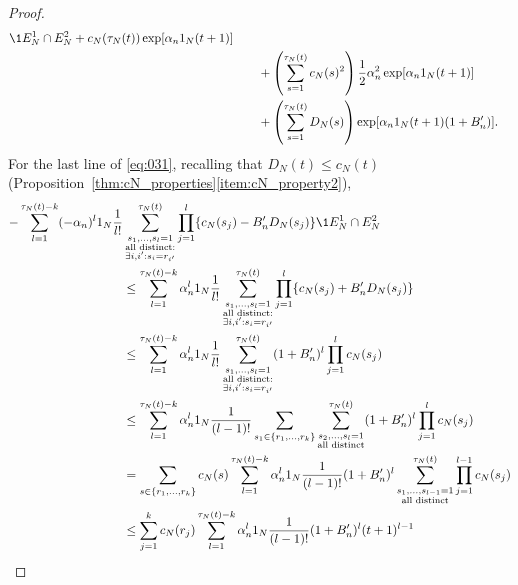 \begin{proof}
\begin{align*}
        \1{E_N^1 \cap E_N^2}
        + c_N(\tau_N(t)) \exp[ \alpha_n \ON (t+1) ] \\
    &\qquad+ \left( \sum_{s=1}^{\tau_N(t)} c_N(s)^2 \right)
        \frac{1}{2} \alpha_n^2 \exp[ \alpha_n \ON (t+1) ] \\
    &\qquad+ \left( \sum_{s=1}^{\tau_N(t)} D_N(s) \right)
        \exp[ \alpha_n \ON (t+1) (1+B_n^\prime) ] .
\end{align*}
For the last line of \eqref{eq:031}, recalling that $D_N(t) \leq c_N(t)$ (Proposition~\ref{thm:cN_properties}\ref{item:cN_property2}),
\begin{align*}
- \sum_{l=1}^{\tau_N(t) -k} (-\alpha_n)^l \ON \frac{1}{l!}
        &\sum_{\substack{s_1, \dots, s_l =1 \\ \text{all distinct}: 
        \\ \exists i,i^\prime : s_i=r_{i^\prime} }}^{\tau_N(t)} 
        \prod_{j=1}^l \{ c_N(s_j) - B_n^\prime D_N(s_j) \} 
        \1{E_N^1 \cap E_N^2} \\
&\leq \sum_{l=1}^{\tau_N(t) -k} \alpha_n^l \ON \frac{1}{l!}
        \sum_{\substack{s_1, \dots, s_l =1 \\ \text{all distinct}: 
        \\ \exists i,i^\prime : s_i=r_{i^\prime} }}^{\tau_N(t)} 
        \prod_{j=1}^l \{ c_N(s_j) + B_n^\prime D_N(s_j) \} \\
&\leq \sum_{l=1}^{\tau_N(t) -k} \alpha_n^l \ON \frac{1}{l!}
        \sum_{\substack{s_1, \dots, s_l =1 \\ \text{all distinct}: 
        \\ \exists i,i^\prime : s_i=r_{i^\prime} }}^{\tau_N(t)} 
        (1 + B_n^\prime)^l \prod_{j=1}^l c_N(s_j) \\
&\leq \sum_{l=1}^{\tau_N(t) -k} \alpha_n^l \ON
        \frac{1}{(l-1)!} \sum_{s_1 \in \{r_1,\dots,r_k\} } 
        \sum_{\substack{ s_2, \dots, s_l =1 \\ \text{all distinct} }}^{\tau_N(t)}
        (1 + B_n^\prime)^l \prod_{j=1}^l c_N(s_j) \\
&= \sum_{s \in \{r_1,\dots,r_k\} } c_N(s)
        \sum_{l=1}^{\tau_N(t) -k} \alpha_n^l \ON
        \frac{1}{(l-1)!}  (1 + B_n^\prime)^l
        \sum_{\substack{ s_1, \dots, s_{l-1} =1 \\ \text{all distinct} }}^{\tau_N(t)}
        \prod_{j=1}^{l-1} c_N(s_j) \\
&\leq \sum_{j=1}^k c_N(r_j)
        \sum_{l=1}^{\tau_N(t) -k} \alpha_n^l \ON
        \frac{1}{(l-1)!}  (1 + B_n^\prime)^l (t+1)^{l-1} \\

\end{align*}
\end{proof}
